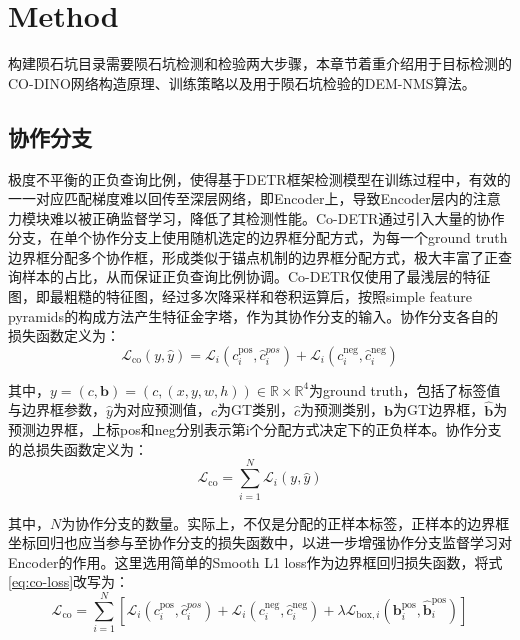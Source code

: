 \section{Method}
\label{sec:method}
构建陨石坑目录需要陨石坑检测和检验两大步骤，本章节着重介绍用于目标检测的CO-DINO网络构造原理、训练策略以及用于陨石坑检验的DEM-NMS算法。
\subsection{协作分支}
极度不平衡的正负查询比例，使得基于DETR框架检测模型在训练过程中，有效的一一对应匹配梯度难以回传至深层网络，即Encoder上，导致Encoder层内的注意力模块难以被正确监督学习，降低了其检测性能。Co-DETR\cite{zongDETRsCollaborativeHybrid2023}通过引入大量的协作分支，在单个协作分支上使用随机选定的边界框分配方式，为每一个ground truth边界框分配多个协作框，形成类似于锚点机制的边界框分配方式，极大丰富了正查询样本的占比，从而保证正负查询比例协调。Co-DETR仅使用了最浅层的特征图，即最粗糙的特征图，经过多次降采样和卷积运算后，按照simple feature pyramids\cite{liExploringPlainVision2022}的构成方法产生特征金字塔，作为其协作分支的输入。协作分支各自的损失函数定义为：
\begin{equation}
  \mathcal{L}_\text{co}(y,\hat{y}) = \mathcal{L}_i(c^\text{pos}_i,\hat{c}_i^{pos})+\mathcal{L}_i(c^\text{neg}_i, \hat{c}_i^\text{neg})
\end{equation}\par
其中，$y=(c,\mathbf{b})=(c,(x,y,w,h))\in\mathbb{R}\times\mathbb{R}^{4}$为ground truth，包括了标签值与边界框参数，$\hat{y}$为对应预测值，$c$为GT类别，$\hat{c}$为预测类别，$\mathbf{b}$为GT边界框，$\mathbf{\hat{b}}$为预测边界框，上标pos和neg分别表示第i个分配方式决定下的正负样本。协作分支的总损失函数定义为：
\begin{equation}
  \mathcal{L}_\text{co} = \sum_{i=1}^{N}\mathcal{L}_i(y,\hat{y})
  \label{eq:co-loss}
\end{equation}\par
其中，$N$为协作分支的数量。实际上，不仅是分配的正样本标签，正样本的边界框坐标回归也应当参与至协作分支的损失函数中，以进一步增强协作分支监督学习对Encoder的作用。这里选用简单的Smooth L1 loss作为边界框回归损失函数，将式\ref{eq:co-loss}改写为：
\begin{equation}
  \mathcal{L}_\text{co} = \sum_{i=1}^{N}\left[\mathcal{L}_i(c^\text{pos}_i,\hat{c}_i^{pos})+\mathcal{L}_i(c^\text{neg}_i, \hat{c}_i^\text{neg})+\lambda\mathcal{L}_{\text{box},i}(\mathbf{b}^\text{pos}_i,\mathbf{\hat{b}}_i^\text{pos})\right]
  \label{eq:co-loss-reg}
\end{equation}\par
